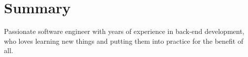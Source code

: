 \section{Summary}
\sectionStart
  \summaryText
  {Passionate software engineer with years of experience in back-end development, who loves learning new things and putting them into practice for the benefit of all.}
\sectionEnd